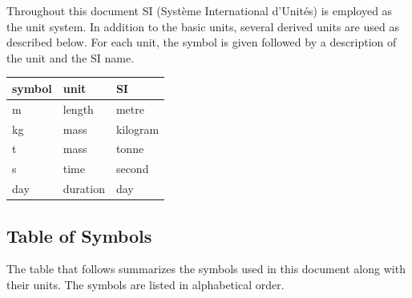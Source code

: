 \documentclass[12pt]{article}
\begin{document}
Throughout this document SI (Syst\`{e}me International d'Unit\'{e}s) is employed
as the unit system.  In addition to the basic units, several derived units are
used as described below.  For each unit, the symbol is given followed by a
description of the unit and the SI name.
~\newline

\renewcommand{\arraystretch}{1.2}
  \noindent \begin{tabular}{l l l} 
    \toprule		
    \textbf{symbol} & \textbf{unit} & \textbf{SI}\\
    \midrule 

    \si{\metre} & length & metre \\
    \si{\kilogram} & mass & kilogram \\
    \si{t} & mass & tonne\\
    \si{\second} & time & second \\
    \si{day} & duration & day \\

    \bottomrule
  \end{tabular}

\subsection{Table of Symbols}

The table that follows summarizes the symbols used in this document along with
their units. The symbols are listed in alphabetical order.

\break
\break 
\end{document}
